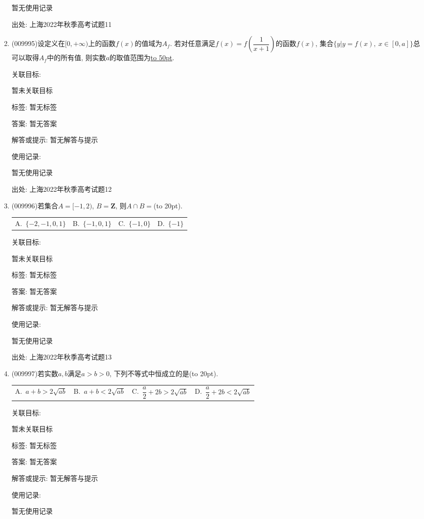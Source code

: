 \documentclass[10pt,a4paper]{article}
\newcommand{\blank}[1]{\underline{\hbox to #1pt{}}}
\newcommand{\bracket}[1]{(\hbox to #1pt{})}
\newcommand{\fourch}[4]{\par\begin{tabular}{p{.23\textwidth}p{.23\textwidth}p{.23\textwidth}p{.23\textwidth}}
A.~#1 &B.~#2& C.~#3& D.~#4
\end{tabular}}
\begin{document}
\begin{enumerate}[1.]
暂无使用记录


出处: 上海2022年秋季高考试题11
\item { (009995)}设定义在$[0,+\infty)$上的函数$f(x)$的值域为$A_f$. 若对任意满足$f(x)=f(\dfrac 1{x+1})$的函数$f(x)$, 集合$\{y|y=f(x), \ x\in [0,a]\}$总可以取得$A_f$中的所有值, 则实数$a$的取值范围为\blank{50}.


关联目标:

暂未关联目标



标签: 暂无标签

答案: 暂无答案

解答或提示: 暂无解答与提示

使用记录:

暂无使用记录


出处: 上海2022年秋季高考试题12
\item { (009996)}若集合$A=[-1,2)$, $B=\mathbf{Z}$, 则$A\cap B=$\bracket{20}.
\fourch{$\{-2,-1,0,1\}$}{$\{-1,0,1\}$}{$\{-1,0\}$}{$\{-1\}$}


关联目标:

暂未关联目标



标签: 暂无标签

答案: 暂无答案

解答或提示: 暂无解答与提示

使用记录:

暂无使用记录


出处: 上海2022年秋季高考试题13
\item { (009997)}若实数$a,b$满足$a>b>0$, 下列不等式中恒成立的是\bracket{20}.
\fourch{$a+b>2\sqrt{ab}$}{$a+b<2\sqrt{ab}$}{$\dfrac a2+2b>2\sqrt{ab}$}{$\dfrac a2+2b<2\sqrt{ab}$}


关联目标:

暂未关联目标



标签: 暂无标签

答案: 暂无答案

解答或提示: 暂无解答与提示

使用记录:

暂无使用记录



\end{enumerate}
\end{document}
